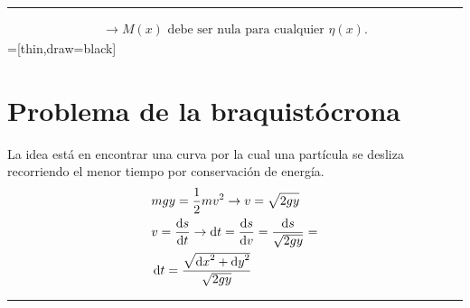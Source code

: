\documentclass[../main]{subfiles}
\begin{document}
\noindent\begin{minipage}{.45\textwidth}
  \centering
  \rule{4cm}{3cm}
  \label{fig:figure}
\end{minipage}
\begin{minipage}{.45\textwidth}
\begin{align*}
    \rightarrow M(x)\text{ debe ser nula para cualquier }\eta(x).
\end{align*}
=[thin,draw=black]
\end{minipage}

\section{Problema de la braquistócrona}

\noindent\begin{minipage}{.45\textwidth}
La idea está en encontrar una curva por la cual una partícula se desliza recorriendo el menor tiempo por conservación de energía.
\begin{align*}
    &mgy=\frac{1}{2}mv^2\rightarrow v=\sqrt{2gy}\\
    &v=\dv{s}{t}\rightarrow \dd{t}=\dv{s}{v}=\frac{\dd{s}}{\sqrt{2gy}}=\\
    &\dd{t}=\frac{\sqrt{\dd{x}^{2}+\dd{y}^{2}}}{\sqrt{2gy}}
\end{align*}
\end{minipage}
\begin{minipage}{.45\textwidth}
  \centering
  \rule{4cm}{3cm}
  \label{fig:figure}
\end{minipage}
\end{document}
